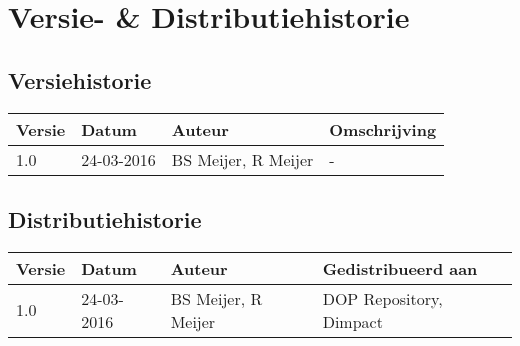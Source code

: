 \section*{Versie- \& Distributiehistorie}
\subsection*{Versiehistorie}
\begin{tabularx}{\linewidth} { | l | l | l | X |} \hline
\textbf{Versie} & \textbf{Datum} & \textbf{Auteur} & \textbf{Omschrijving} \\ \hline
1.0 & 24-03-2016 & BS Meijer, R Meijer & - \\ \hline
\end{tabularx}

\subsection*{Distributiehistorie}
\begin{tabularx}{\linewidth} { | l | l | l | X |} \hline
\textbf{Versie} & \textbf{Datum} & \textbf{Auteur} & \textbf{Gedistribueerd aan} \\ \hline
1.0 & 24-03-2016 & BS Meijer, R Meijer & DOP Repository, Dimpact \\ \hline
\end{tabularx}
\clearpage

